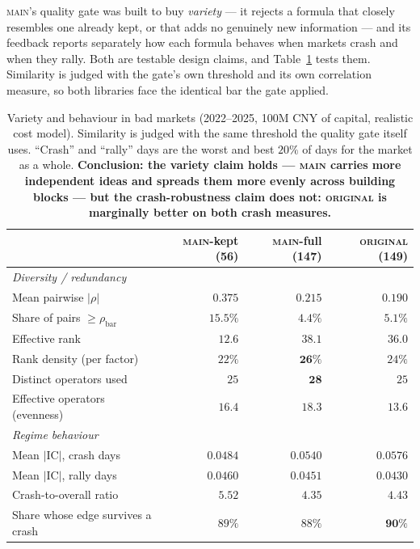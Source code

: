 \documentclass[11pt]{article}
\newcommand{\main}{\textsc{main}}
\newcommand{\orig}{\textsc{original}}
\begin{document}
\main{}'s quality gate was built to buy \emph{variety} --- it rejects a formula that
closely resembles one already kept, or that adds no genuinely new information --- and
its feedback reports separately how each formula behaves when markets crash and when
they rally. Both are testable design claims, and Table~\ref{tab:diversity} tests them.
Similarity is judged with the gate's own threshold and its own correlation measure, so
both libraries face the identical bar the gate applied.

\begin{table}[h]
\centering\small
\begin{tabular}{lrrr}
\toprule
& \main{}-kept (56) & \main{}-full (147) & \orig{} (149) \\
\midrule
\multicolumn{4}{l}{\emph{Diversity / redundancy}} \\
Mean pairwise $|\rho|$        & $0.375$ & $0.215$ & $\bm{0.190}$ \\
Share of pairs $\ge \rho_{\text{bar}}$ & $15.5\%$ & $\bm{4.4\%}$ & $5.1\%$ \\
Effective rank                & $12.6$ & $\bm{38.1}$ & $36.0$ \\
Rank density (per factor)     & $22\%$ & $\bm{26\%}$ & $24\%$ \\
Distinct operators used       & $25$ & $\bm{28}$ & $25$ \\
Effective operators (evenness)& $16.4$ & $\bm{18.3}$ & $13.6$ \\
\midrule
\multicolumn{4}{l}{\emph{Regime behaviour}} \\
Mean $|$IC$|$, crash days     & $0.0484$ & $0.0540$ & $\bm{0.0576}$ \\
Mean $|$IC$|$, rally days     & $\bm{0.0460}$ & $0.0451$ & $0.0430$ \\
Crash-to-overall ratio        & $\bm{5.52}$ & $4.35$ & $4.43$ \\
Share whose edge survives a crash & $89\%$ & $88\%$ & $\bm{90\%}$ \\
\bottomrule
\end{tabular}
\caption{Variety and behaviour in bad markets (2022--2025, 100M CNY of capital,
realistic cost model). Similarity is judged with the same threshold the quality gate
itself uses. ``Crash'' and ``rally'' days are the worst and best $20\%$ of days for the
market as a whole. \textbf{Conclusion: the variety claim holds --- \main{} carries more
independent ideas and spreads them more evenly across building blocks --- but the
crash-robustness claim does not: \orig{} is marginally better on both crash measures.}}
\label{tab:diversity}
\end{table}
\end{document}
